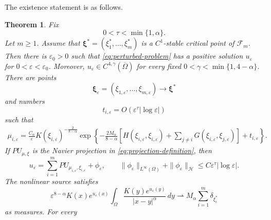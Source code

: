 \documentclass[11pt]{article}
\newtheorem{theorem}{Theorem}[section]
\numberwithin{equation}{section}
\begin{document}
The existence statement is as follows.

\begin{theorem}\label{thm:existence}
Fix
\begin{equation}\label{eq:tau-fixed-intro}
0<\tau<\min\{1,\alpha\}.
\end{equation}
Let $m\geq1$. Assume that
$\boldsymbol\xi^{*}=(\xi_{1}^{*},\ldots,\xi_{m}^{*})$ is a
$C^{1}$-stable critical point of $\mathcal F_m$. Then there is
$\varepsilon_{0}>0$ such that \eqref{eq:perturbed-problem} has a
positive solution $u_\varepsilon$ for
$0<\varepsilon<\varepsilon_{0}$. Moreover,
$u_\varepsilon\in C^{4,\gamma}(\overline\Omega)$ for every fixed
$0<\gamma<\min\{1,4-\alpha\}$. There are points
\begin{equation}\label{eq:center-convergence-intro}
\boldsymbol\xi_\varepsilon
=(\xi_{1,\varepsilon},\ldots,\xi_{m,\varepsilon})
\longrightarrow\boldsymbol\xi^{*}
\end{equation}
and numbers
\begin{equation*}
t_{i,\varepsilon}
=O(\varepsilon^\tau|\log\varepsilon|)
\end{equation*}
such that
\begin{equation}\label{eq:scales-intro}
\begin{aligned}
\mu_{i,\varepsilon}
={}\frac{C_\alpha}{\varepsilon}
K(\xi_{i,\varepsilon})^{-\frac{2}{8-\alpha}}
\exp\left\{
-\frac{2M_\alpha}{8-\alpha}
\left[
H(\xi_{i,\varepsilon},\xi_{i,\varepsilon})
+\sum_{j\ne i}G(\xi_{i,\varepsilon},\xi_{j,\varepsilon})
\right]
+t_{i,\varepsilon}
\right\}.
\end{aligned}
\end{equation}
If $PU_{\mu,\xi}$ is the Navier projection in
\eqref{eq:projection-definition}, then
\begin{equation}\label{eq:solution-expansion-intro}
u_\varepsilon
=\sum_{i=1}^{m}PU_{\mu_{i,\varepsilon},\xi_{i,\varepsilon}}
+\phi_\varepsilon,
\qquad
\|\phi_\varepsilon\|_{L^\infty(\Omega)}
+\|\phi_\varepsilon\|_{\mathcal H}
\leq C\varepsilon^\tau|\log\varepsilon|.
\end{equation}
The nonlinear source satisfies
\begin{equation}\label{eq:measure-convergence-intro}
\varepsilon^{8-\alpha}K(x)e^{u_\varepsilon(x)}
\int_\Omega
\frac{K(y)e^{u_\varepsilon(y)}}{|x-y|^\alpha}\,dy
\rightharpoonup
M_\alpha\sum_{i=1}^{m}\delta_{\xi_i^{*}}
\end{equation}
as measures. For every
\begin{equation}\label{eq:outer-beta-range}

\end{equation}
\end{theorem}
\end{document}
